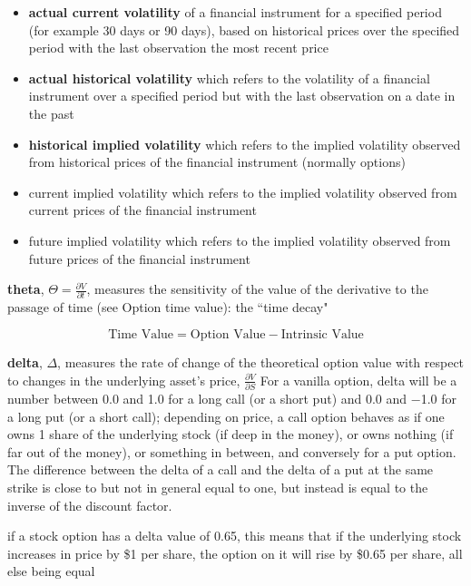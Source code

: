 \documentclass[10pt,landscape]{article}
\begin{document}
\begin{multicols}{3}
\begin{itemize}
	\item \textbf{actual current volatility} of a financial instrument for a specified period (for example 30 days or 90 days), based on historical prices over the specified period with the last observation the most recent price
	\item \textbf{actual historical volatility} which refers to the volatility of a financial instrument over a specified period but with the last observation on a date in the past 
	\item \textbf{historical implied volatility} which refers to the implied volatility observed from historical prices of the financial instrument (normally options)
	\item current implied volatility which refers to the implied volatility observed from current prices of the financial instrument
	\item future implied volatility which refers to the implied volatility observed from future prices of the financial instrument
\end{itemize}


\vspace{0.15cm}

\textbf{theta}, $\Theta=\tfrac {\partial V}{\partial t}$,  measures the sensitivity of the value of the derivative to the passage of time (see Option time value): the ``time decay" 

$$\textrm{Time Value} = \textrm{Option Value} - \textrm{Intrinsic Value}$$

\vspace{0.15cm}

\textbf{delta}, $\Delta$, measures the rate of change of the theoretical option value with respect to changes in the underlying asset's price, $\tfrac {\partial V}{\partial S}$ For a vanilla option, delta will be a number between 0.0 and 1.0 for a long call (or a short put) and 0.0 and −1.0 for a long put (or a short call); depending on price, a call option behaves as if one owns 1 share of the underlying stock (if deep in the money), or owns nothing (if far out of the money), or something in between, and conversely for a put option. The difference between the delta of a call and the delta of a put at the same strike is close to but not in general equal to one, but instead is equal to the inverse of the discount factor.

\vspace{0.15cm}

if a stock option has a delta value of 0.65, this means that if the underlying stock increases in price by \$1 per share, the option on it will rise by \$0.65 per share, all else being equal


\end{multicols}
\end{document}
